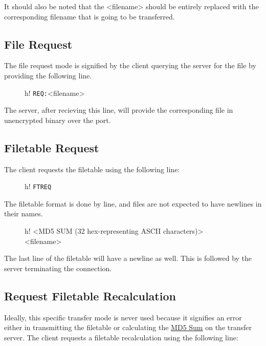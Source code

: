 \documentclass[12pt]{article}
\begin{document}
It should also be noted that the <filename> should be entirely replaced with
the corresponding filename that is going to be transferred.

\subsection{File Request}
\label{ssec:Request File}
The file request mode is signified by the client querying the server for the
file by providing the following line.

\begin{figure}{h!}
	\centering
	\verb+REQ:+\textvisiblespace <filename>\carriagereturn\carriagereturn
	\label{Request File Mode}
\end{figure}

The server, after recieving this line, will provide the corresponding file in
unencrypted binary over the port.

\subsection{Filetable Request}
\label{ssec:Request Filetable}
The client requests the filetable using the following line:

\begin{figure}{h!}
	\centering
	\verb+FTREQ+\carriagereturn\carriagereturn
	\label{Filetable Request Mode}
\end{figure}

The filetable format is done by line, and files are not expected to have
newlines in their names.

\begin{figure}{h!}
	\centering
	<MD5 SUM (32 hex-representing ASCII characters)>\textvisiblespace
	\textvisiblespace<filename>\carriagereturn
	\label{MD5 Sum and Filename Specification}
\end{figure}

The last line of the filetable will have a newline as well.  This is followed
by the server terminating the connection.

\subsection{Request Filetable Recalculation}
\label{ssec:Recalculate MD5}
Ideally, this specific transfer mode is never used because it signifies an
error either in transmitting the filetable or calculating the
\href{http://en.wikipedia.org/wiki/Md5sum}{MD5 Sum} on the transfer server.
The client requests a filetable recalculation using the following line:
\end{document}
